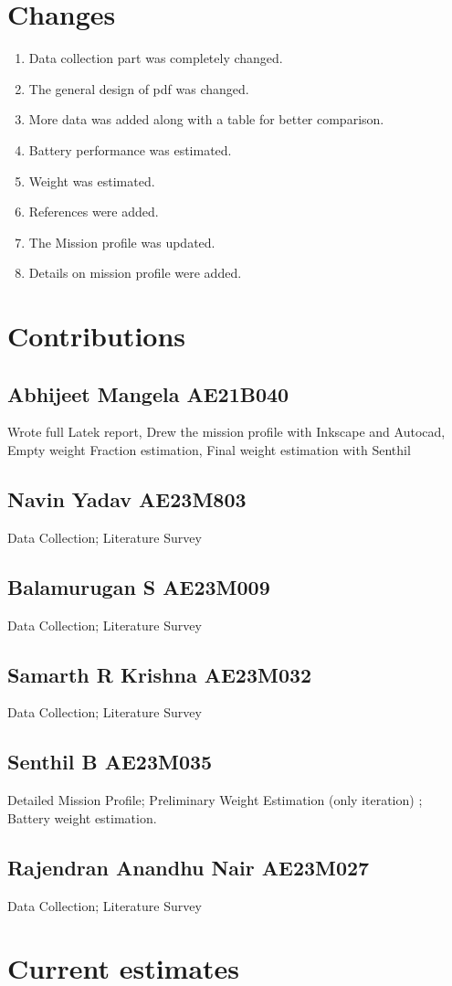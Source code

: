 \documentclass[12 pt]{article}
\begin{document}
\newpage

\section{Changes}
\begin{enumerate}
    \item Data collection part was completely changed.
    \item The general design of pdf was changed.
    \item More data was added along with a table for better comparison.
    \item Battery performance was estimated.
    \item Weight was estimated.
    \item References were added.
    \item The Mission profile was updated.
    \item Details on mission profile were added.
\end{enumerate}

\section{Contributions}
\subsection{Abhijeet Mangela AE21B040}
Wrote full Latek report, Drew the mission profile with Inkscape and Autocad, Empty weight Fraction estimation, Final weight estimation with Senthil

\subsection{Navin Yadav AE23M803}

Data Collection; Literature Survey

\subsection{Balamurugan S AE23M009}

Data Collection; Literature Survey

\subsection{Samarth R Krishna AE23M032}

Data Collection; Literature Survey

\subsection{Senthil B AE23M035}

Detailed Mission Profile; Preliminary Weight Estimation (only iteration) ; Battery weight estimation.

\subsection{Rajendran Anandhu Nair AE23M027}

Data Collection; Literature Survey

\section{Current estimates}
\end{document}
